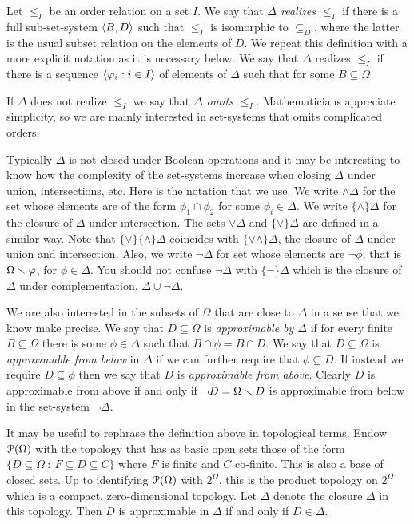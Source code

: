 \documentclass[creche.tex]{subfiles}
\begin{document}
Let $\le_I$ be an order relation on a set $I$. We say that \emph{$\Delta$ realizes $\le_I$\/} if there is a full sub-set-system $\<B,D\>$ such that $\le_I$ is isomorphic to $\subseteq_D$, where the latter is the usual subset relation on the elements of $D$. We repeat this definition with a more explicit notation as it is necessary below. We say that $\Delta$ realizes $\le_I$ if there is a sequence $\<\phi_i:i\in I\>$ of elements of $\Delta$ such that for some $B\subseteq\Omega$ 


If $\Delta$ does not realize $\le_I$ we say that  \emph{$\Delta$ omits $\le_I$}. Mathematicians appreciate simplicity, so we are mainly interested in set-systems that omits complicated orders.


Typically $\Delta$ is not closed under Boolean operations and it may be interesting to know how the complexity of the set-systems increase when closing $\Delta$ under union, intersections, etc. Here is the notation that we use. We write \emph{$\wedge\Delta$\/} for the set whose elements are of the form $\phi_1\cap \phi_2$ for some $\phi_i\in\Delta$. We write \emph{$\{\wedge\}\Delta$\/} for the closure of $\Delta$ under intersection. The sets \emph{$\vee\Delta$\/} and  \emph{$\{\vee\}\Delta$\/} are defined in a similar way. Note that $\{\vee\}\{\wedge\}\Delta$ coincides with \emph{$\{\vee\wedge\}\Delta$}, the closure of $\Delta$ under union and intersection. Also, we write \emph{$\neg\Delta$\/} for set whose elements are \emph{$\neg\phi$}, that is $\Omega\sm\phi$, for $\phi\in\Delta$.  You should not confuse $\neg\Delta$ with \emph{$\{\neg\}\Delta$\/} which is the closure of $\Delta$ under complementation, $\Delta\cup\neg\Delta$.


We are also interested in the subsets of $\Omega$ that are close to $\Delta$ in a sense that we know make precise. We say that $D\subseteq\Omega$ is \emph{approximable by $\Delta$\/} if for every finite $B\subseteq\Omega$ there is some $\phi\in\Delta$ such that $B\cap\phi=B\cap D$. We say that $D\subseteq\Omega$ is \emph{approximable from below\/} in $\Delta$ if we can further require that $\phi\subseteq D$. If instead we require $D\subseteq\phi$ then we say that $D$ is \emph{approximable from above}. Clearly $D$ is approximable from above if and only if $\neg D=\Omega\sm D$ is approximable from below in the set-system $\neg\Delta$. 

It may be useful to rephrase the definition above in topological terms. Endow $\P(\Omega)$ with the topology that has as basic open sets those of the form $\big\{D\subseteq \Omega\ :\ F\subseteq D\subseteq C\big\}$ where $F$ is finite and $C$ co-finite. This is also a base of closed sets. Up to identifying $\P(\Omega)$ with $2^\Omega$, this is the product topology on $2^\Omega$ which is a compact, zero-dimensional topology. Let \emph{$\bar\Delta$\/} denote the closure $\Delta$ in this topology. Then $D$ is approximable in $\Delta$ if and only if $D\in\bar\Delta$.
\end{document}

